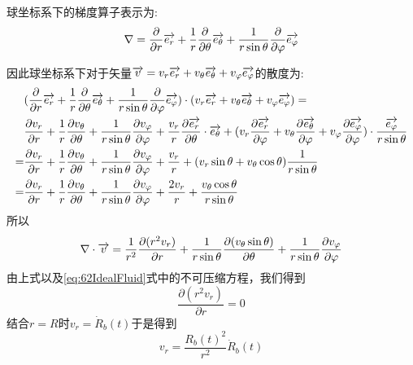 球坐标系下的梯度算子表示为:
\begin{equation}\label{eq:62GradientSphere}
\nabla = \frac{\partial }{\partial r} \overrightarrow{e_r} + \frac{1}{r} \frac{\partial}{\partial \theta} \overrightarrow{e_{\theta}}+
\frac{1}{r\sin\theta}
\frac{\partial }{\partial \varphi}\overrightarrow{e_{\varphi}}
\end{equation}

因此球坐标系下对于矢量$\overrightarrow{v}=v_r\overrightarrow{e_r}+v_{\theta}\overrightarrow{e_{\theta}}+v_{\varphi}\overrightarrow{e_{\varphi}}$的散度为:
\begin{align*}
&(\frac{\partial }{\partial r} \overrightarrow{e_r} + \frac{1}{r} \frac{\partial}{\partial \theta} \overrightarrow{e_{\theta}}+\frac{1}{r\sin\theta}
\frac{\partial }{\partial \varphi}\overrightarrow{e_{\varphi}})\cdot (v_r\overrightarrow{e_r}+v_{\theta}\overrightarrow{e_{\theta}}+v_{\varphi}\overrightarrow{e_{\varphi}}) =\\
&\frac{\partial v_r}{\partial r}+\frac{1}{r}\frac{\partial v_{\theta}}{\partial \theta}+\frac{1}{r\sin\theta}
\frac{\partial v_{\varphi}}{\partial \varphi} +\frac{v_r}{r}\frac{\partial \overrightarrow{e_r}}{\partial \theta}\cdot \overrightarrow{e_{\theta}}+
(v_r\frac{\partial \overrightarrow{e_r}}{\partial \varphi}+v_{\theta}\frac{\partial \overrightarrow{e_{\theta}}}{\partial \varphi}+
v_{\varphi}\frac{\partial \overrightarrow{e_{\varphi}}}{\partial \varphi})\cdot \frac{\overrightarrow{e_{\varphi}}}{r \sin\theta}\\
=&\frac{\partial v_r}{\partial r}+\frac{1}{r}\frac{\partial v_{\theta}}{\partial \theta}+\frac{1}{r\sin\theta}
\frac{\partial v_{\varphi}}{\partial \varphi} +\frac{v_r}{r}+
(v_r\sin\theta+v_{\theta}\cos\theta)\frac{1}{r \sin\theta}\\
=&\frac{\partial v_r}{\partial r}+\frac{1}{r}\frac{\partial v_{\theta}}{\partial \theta}+\frac{1}{r\sin\theta}
\frac{\partial v_{\varphi}}{\partial \varphi} +\frac{2v_r}{r}+\frac{v_{\theta}\cos\theta}{r \sin\theta}
\end{align*}
所以
\begin{equation}
\nabla \cdot \overrightarrow{v}=\frac{1}{r^2}\frac{\partial (r^2 v_r)}{\partial r}+
\frac{1}{r\sin\theta}\frac{\partial (v_{\theta}\sin\theta)}{\partial \theta}+
\frac{1}{r\sin\theta}\frac{\partial v_{\varphi}}{\partial \varphi} 
\end{equation}
由上式以及\eqref{eq:62IdealFluid}式中的不可压缩方程，我们得到
\begin{equation}
\frac{\partial (r^2 v_r)}{\partial r}=0
\end{equation}
结合$r=R$时$v_r=\dot{R}_b(t)$于是得到
\begin{equation}\label{eq:62vrResult}
v_r=\frac{R_b(t)^2}{r^2}\dot{R}_b(t)
\end{equation}
